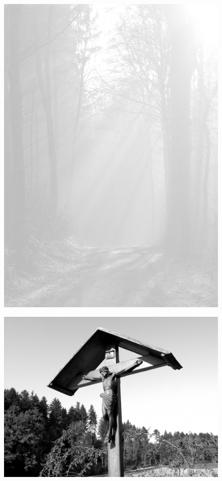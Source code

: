 \documentclass[ngerman,a4paper,11pt]{scrreprt}
\begin{document}
\begin{figure}[H]
\centering
\includegraphics[width=\textwidth,height=.8\textheight]{Bilder/Bilder/./750_0010_23639_1256619_Wald.png}
\end{figure}

\begin{figure}[H]
\centering
\includegraphics[width=\textwidth,height=.8\textheight]{Bilder/Bilder/./750_0010_25344_Jesus_am_Holzkreuz.png}
\end{figure}
\end{document}
